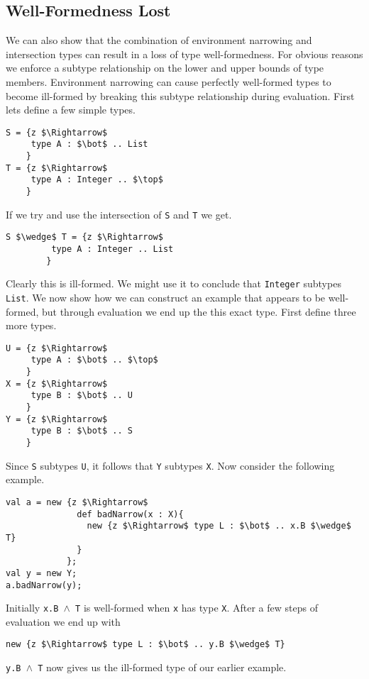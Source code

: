 \documentclass{llncs}
\numberwithin{subcase}{casethm}
\numberwithin{casethm}{theorem}
\numberwithin{casethm}{lemma}
\begin{document}
\subsection{Well-Formedness Lost}

We can also show that the combination of environment narrowing 
and intersection types can result in a loss of type well-formedness. 
For obvious reasons we enforce a subtype relationship on the lower 
and upper bounds of type members. Environment narrowing 
can cause perfectly well-formed types to become ill-formed by breaking 
this subtype relationship during evaluation. First lets define a few 
simple types.
\begin{lstlisting}[mathescape, style=custom_lang]
S = {z $\Rightarrow$
     type A : $\bot$ .. List
    }
T = {z $\Rightarrow$
     type A : Integer .. $\top$
    }
\end{lstlisting}
If we try and use the intersection of \texttt{S} and \texttt{T}
we get. 
\begin{lstlisting}[mathescape, style=custom_lang]
S $\wedge$ T = {z $\Rightarrow$
         type A : Integer .. List
        }
\end{lstlisting}
Clearly this is ill-formed. We might use it to conclude 
that \texttt{Integer} subtypes \texttt{List}. We now show how 
we can construct an example that appears to be well-formed, but 
through evaluation we end up the this exact type. First define 
three more types.
\begin{lstlisting}[mathescape, style=custom_lang]
U = {z $\Rightarrow$
     type A : $\bot$ .. $\top$
    }
X = {z $\Rightarrow$
     type B : $\bot$ .. U
    }
Y = {z $\Rightarrow$
     type B : $\bot$ .. S
    }
\end{lstlisting}
Since \texttt{S} subtypes \texttt{U}, it follows that 
\texttt{Y} subtypes \texttt{X}.
Now consider the following example.
\begin{lstlisting}[mathescape, style=custom_lang]
val a = new {z $\Rightarrow$
              def badNarrow(x : X){
                new {z $\Rightarrow$ type L : $\bot$ .. x.B $\wedge$ T}
              }
            };
val y = new Y;
a.badNarrow(y);
\end{lstlisting}
Initially \texttt{x.B $\wedge$ T} is well-formed when \texttt{x} 
has type \texttt{X}. After a few steps of evaluation we end up with 
\begin{lstlisting}[mathescape, style=custom_lang]
new {z $\Rightarrow$ type L : $\bot$ .. y.B $\wedge$ T}
\end{lstlisting}
\texttt{y.B $\wedge$ T} now gives us the ill-formed type of 
our earlier example.
\end{document}
